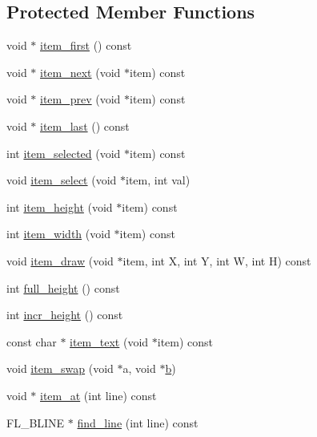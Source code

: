 \subsection*{Protected Member Functions}
\begin{DoxyCompactItemize}
\item 
void $\ast$ \hyperlink{class_fl___browser_a7822c6d04744af8f9ffa7a1e0c46955c}{item\+\_\+first} () const
\item 
void $\ast$ \hyperlink{class_fl___browser_aca0d9393c07552ce4ee75a9a10dbe93e}{item\+\_\+next} (void $\ast$item) const
\item 
void $\ast$ \hyperlink{class_fl___browser_a0fbf4d057bc1b7afcdd872b78ee8526b}{item\+\_\+prev} (void $\ast$item) const
\item 
void $\ast$ \hyperlink{class_fl___browser_a5de7360f3e39ad20c3bf552893a92626}{item\+\_\+last} () const
\item 
int \hyperlink{class_fl___browser_af407fce6bdc3c2892aad6a38ef647f9e}{item\+\_\+selected} (void $\ast$item) const
\item 
void \hyperlink{class_fl___browser_afe09fb2afd71d7504d23742d11327be1}{item\+\_\+select} (void $\ast$item, int val)
\item 
int \hyperlink{class_fl___browser_a57103fdfb68bbe7ebb8bbe133ebe9009}{item\+\_\+height} (void $\ast$item) const
\item 
int \hyperlink{class_fl___browser_acc938270d35aeb63341f2953a740d7f8}{item\+\_\+width} (void $\ast$item) const
\item 
void \hyperlink{class_fl___browser_a99dd1f2cf866b107a5742d1e35774620}{item\+\_\+draw} (void $\ast$item, int X, int Y, int W, int H) const
\item 
int \hyperlink{class_fl___browser_aeadc4b1c149e211228f0cfaaf9df929f}{full\+\_\+height} () const
\item 
int \hyperlink{class_fl___browser_aa26afc5b34fea349c1baa25f086ba08a}{incr\+\_\+height} () const
\item 
const char $\ast$ \hyperlink{class_fl___browser_add545302a6a8b2a611f6cc4e60475bca}{item\+\_\+text} (void $\ast$item) const
\item 
void \hyperlink{class_fl___browser_aca1943ac78a9dfeee8f76d300dbb398c}{item\+\_\+swap} (void $\ast$a, void $\ast$\hyperlink{forms_8_h_a0ba06a290a384fa06b1b90745827dae2}{b})
\item 
void $\ast$ \hyperlink{class_fl___browser_aa1d22a122c794581b30183f045db2959}{item\+\_\+at} (int line) const
\item 
F\+L\+\_\+\+B\+L\+I\+NE $\ast$ \hyperlink{class_fl___browser_abefae9979ef09100d0c4c811cb3dedd7}{find\+\_\+line} (int line) const

\end{DoxyCompactItemize}
